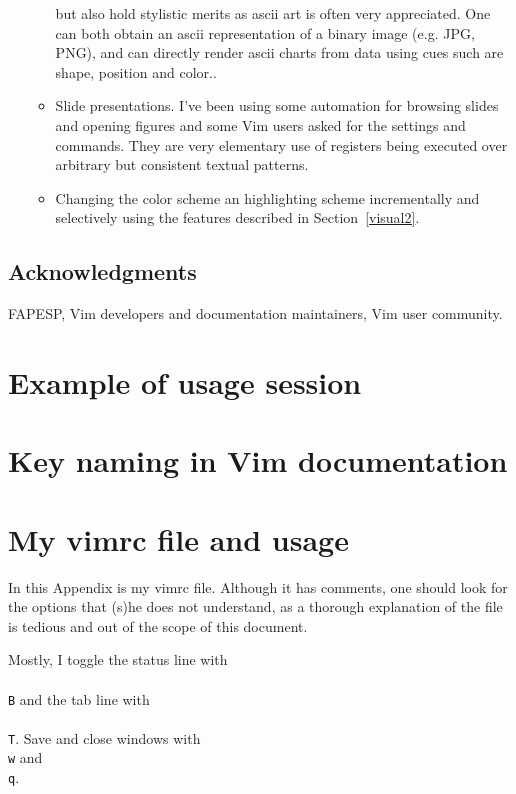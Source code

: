 \documentclass{article}
\begin{document}
\begin{itemize}
\begin{itemize}
        but also hold stylistic merits as ascii art is often
        very appreciated.
        One can both obtain an ascii representation of a binary image (e.g. JPG, PNG),
        and can directly render ascii charts from data using cues such are shape, position
        and color..
      \item Slide presentations. I've been using some automation for browsing
        slides and opening figures and some Vim users asked for the settings and
        commands. They are very elementary use of registers being executed over
        arbitrary but consistent textual patterns.
      \item Changing the color scheme an highlighting scheme incrementally
        and selectively using the features described in Section~\ref{visual2}.
    \end{itemize}
\end{itemize}

\subsection*{Acknowledgments}
FAPESP, Vim developers and documentation maintainers,
Vim user community. 

\appendix
\section{Example of usage session}
\section{Key naming in Vim documentation}
\section{My vimrc file and usage}
In this Appendix is my vimrc file.
Although it has comments, one should
look for the options that (s)he does
not understand, as a thorough explanation
of the file is tedious and out of the scope
of this document.

Mostly, I toggle the status line with \texttt{\\\\B}
and the tab line with \texttt{\\\\T}.
Save and close windows with \texttt{\\w} and \texttt{\\q}.
\end{document}
